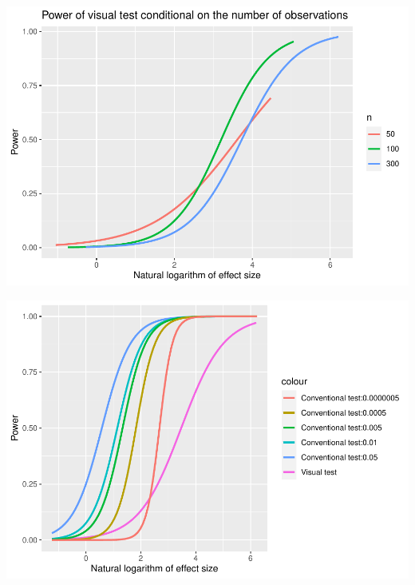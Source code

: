 \documentclass[]{interact}
\theoremstyle{plain}%
\theoremstyle{definition}
\theoremstyle{remark}
\begin{document}
\includegraphics{paper_comparison_files/figure-latex/power-of-visual-test-given-number-of-observations-1.pdf}

\includegraphics{paper_comparison_files/figure-latex/unnamed-chunk-4-1.pdf}



\end{document}

